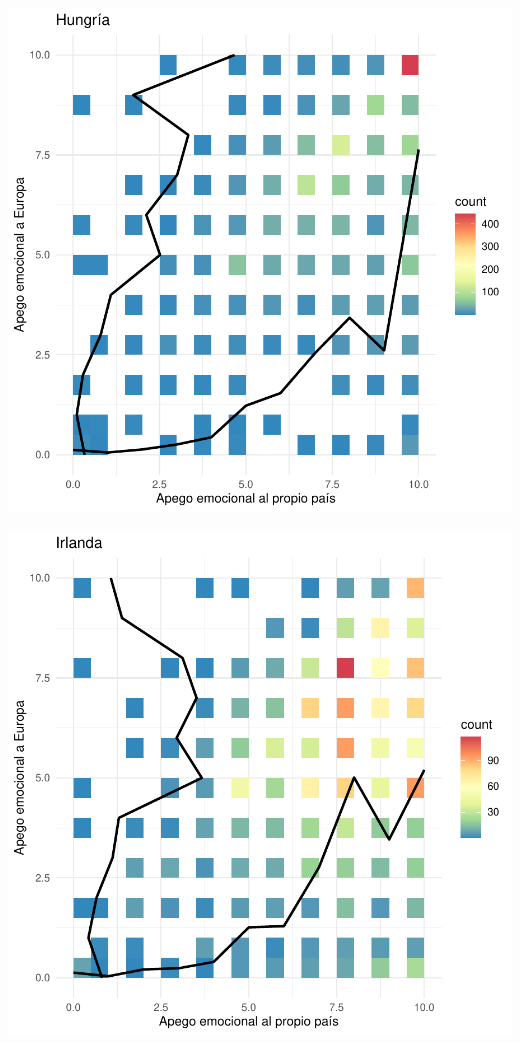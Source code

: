 \documentclass{article}
\begin{document}
\includegraphics{Informe-018}

\includegraphics{Informe-019}
\end{document}
